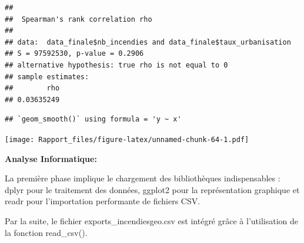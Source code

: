 \documentclass[
]{article}
\newenvironment{Shaded}{\begin{snugshade}}{\end{snugshade}}
\newcommand{\AttributeTok}[1]{\textcolor[rgb]{0.13,0.29,0.53}{#1}}
\newcommand{\ConstantTok}[1]{\textcolor[rgb]{0.56,0.35,0.01}{#1}}
\newcommand{\DecValTok}[1]{\textcolor[rgb]{0.00,0.00,0.81}{#1}}
\newcommand{\FloatTok}[1]{\textcolor[rgb]{0.00,0.00,0.81}{#1}}
\newcommand{\FunctionTok}[1]{\textcolor[rgb]{0.13,0.29,0.53}{\textbf{#1}}}
\newcommand{\NormalTok}[1]{#1}
\newcommand{\SpecialCharTok}[1]{\textcolor[rgb]{0.81,0.36,0.00}{\textbf{#1}}}
\newcommand{\StringTok}[1]{\textcolor[rgb]{0.31,0.60,0.02}{#1}}
\begin{document}
\begin{verbatim}
## 
##  Spearman's rank correlation rho
## 
## data:  data_finale$nb_incendies and data_finale$taux_urbanisation
## S = 97592530, p-value = 0.2906
## alternative hypothesis: true rho is not equal to 0
## sample estimates:
##        rho 
## 0.03635249
\end{verbatim}

\begin{Shaded}
\end{Shaded}

\begin{verbatim}
## `geom_smooth()` using formula = 'y ~ x'
\end{verbatim}

\texttt{[image: Rapport\_files/figure-latex/unnamed-chunk-64-1.pdf]}

\textbf{Analyse Informatique:}

La première phase implique le chargement des bibliothèques
indispensables : dplyr pour le traitement des données, ggplot2 pour la
représentation graphique et readr pour l'importation performante de
fichiers CSV.

Par la suite, le fichier exports\_incendiesgeo.csv est intégré grâce à
l'utilisation de la fonction read\_csv().
\end{document}
